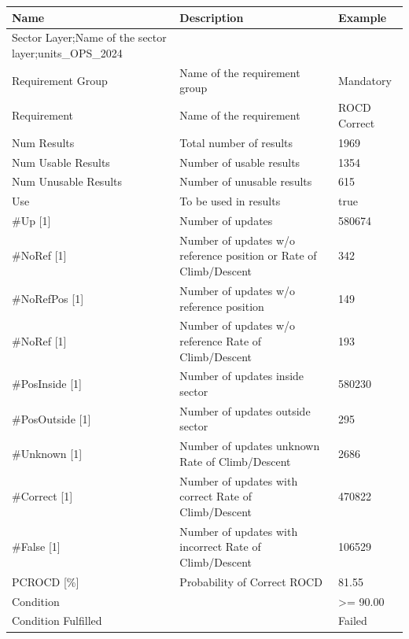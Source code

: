 \begin{center}
 \begin{table}[H]
  \begin{tabularx}{\textwidth}{ | l | X |  l | }
    \hline
    \textbf{Name} & \textbf{Description} & \textbf{Example} \\ \hline
    Sector Layer;Name of the sector layer;units\_OPS\_2024 \\ \hline
    Requirement Group & Name of the requirement group & Mandatory \\ \hline
    Requirement & Name of the requirement & ROCD Correct \\ \hline
    Num Results & Total number of results & 1969 \\ \hline
    Num Usable Results & Number of usable results & 1354 \\ \hline
    Num Unusable Results & Number of unusable results & 615 \\ \hline
    Use & To be used in results & true \\ \hline
    \#Up [1] & Number of updates & 580674 \\ \hline
    \#NoRef [1] & Number of updates w/o reference position or Rate of Climb/Descent & 342 \\ \hline
    \#NoRefPos [1] & Number of updates w/o reference position & 149 \\ \hline
    \#NoRef [1] & Number of updates w/o reference Rate of Climb/Descent & 193 \\ \hline
    \#PosInside [1] & Number of updates inside sector & 580230 \\ \hline
    \#PosOutside [1] & Number of updates outside sector & 295 \\ \hline
    \#Unknown [1] & Number of updates unknown Rate of Climb/Descent & 2686 \\ \hline
    \#Correct [1] & Number of updates with correct Rate of Climb/Descent & 470822 \\ \hline
    \#False [1] & Number of updates with incorrect Rate of Climb/Descent & 106529 \\ \hline
    PCROCD [\%] & Probability of Correct ROCD & 81.55 \\ \hline
    Condition &  & >= 90.00 \\ \hline
    Condition Fulfilled &  & Failed \\ \hline
\end{tabularx}
\end{table}
\end{center}

